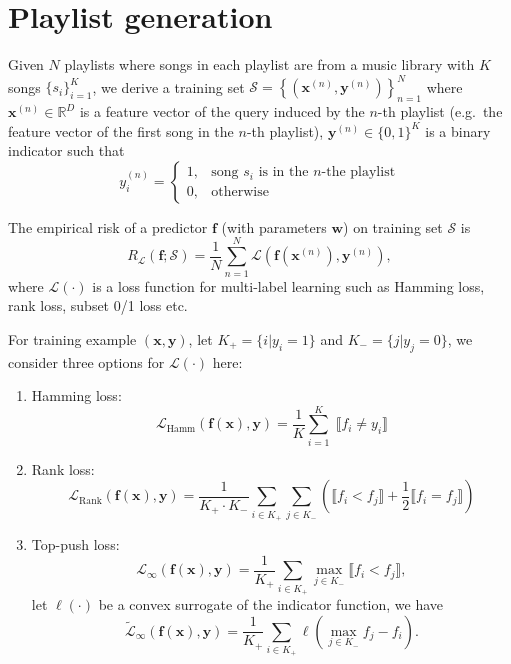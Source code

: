 \documentclass[9pt]{extarticle}
\newcommand{\llb}{\llbracket}
\newcommand{\rrb}{\rrbracket}
\newcommand{\f}{\mathbf{f}}
\newcommand{\x}{\mathbf{x}}
\newcommand{\y}{\mathbf{y}}
\newcommand{\1}{\mathbf{1}}
\newcommand{\w}{\mathbf{w}}
\newcommand{\R}{\mathbb{R}}
\newcommand{\LCal}{\mathcal{L}}
\newcommand{\SCal}{\mathcal{S}}
\newcommand{\pb}[1]{^{({#1})}}
\newcommand{\eg}{e.g.\ }
\begin{document}
\section{Playlist generation}
\label{sec:playlist}


Given $N$ playlists where songs in each playlist are from a music library with $K$ songs $\{s_i\}_{i=1}^K$,
we derive a training set $\SCal = \left\{ \left( \x\pb{n}, \y\pb{n} \right) \right\}_{n=1}^N$ where $\x\pb{n} \in \R^D$ is a feature vector of the query 
induced by the $n$-th playlist (\eg the feature vector of the first song in the $n$-th playlist),
$\y\pb{n} \in \{0,1\}^K$ is a binary indicator such that 
$$
y_i\pb{n} = 
\begin{cases}
1, & \text{song $s_i$ is in the $n$-the playlist} \\
0, & \text{otherwise}
\end{cases}
$$

The empirical risk of a predictor $\f$ (with parameters $\w$) on training set $\SCal$ is
\begin{equation}
\label{eq:risk_pl}
R_{\LCal}(\f; \SCal) = \frac{1}{N} \sum_{n=1}^N \LCal\left(\f(\x\pb{n}), \y\pb{n}\right),
\end{equation}
where $\LCal(\cdot)$ is a loss function for multi-label learning such as Hamming loss, rank loss, subset 0/1 loss etc.

For training example $(\x, \y)$, let $K_+ = \{i |y_i = 1\}$ and $K_- = \{j |y_j = 0\}$, 
we consider three options for $\LCal(\cdot)$ here:
\begin{enumerate}
\item Hamming loss: 
      \begin{equation}
      \label{eq:loss_hamm_pl0}
      \LCal_\text{Hamm}(\f(\x), \y) = \frac{1}{K} \sum_{i=1}^K \; \llb f_i \ne y_i \rrb
      \end{equation}
\item Rank loss: 
      \begin{equation}
      \label{eq:loss_rank_pl0}
      \LCal_\text{Rank}(\f(\x), \y) = \frac{1}{K_+ \cdot K_-} \sum_{i \in K_+} \sum_{j \in K_-} 
                                      \left( \llb f_i < f_j \rrb + \frac{1}{2} \llb f_i = f_j \rrb \right)
      \end{equation}

\item Top-push loss:
      $$\LCal_\infty(\f(\x), \y) = \frac{1}{K_+} \sum_{i \in K_+} \max_{j \in K_-} \llb f_i < f_j \rrb,$$
      let $\ell(\cdot)$ be a convex surrogate of the indicator function, we have
      \begin{equation}
      \label{eq:loss_inf_pl}
      \widetilde{\LCal}_\infty(\f(\x), \y) = \frac{1}{K_+} \sum_{i \in K_+} \ell\left( \max_{j \in K_-} f_j - f_i \right).
      \end{equation}
\end{enumerate}
\end{document}
